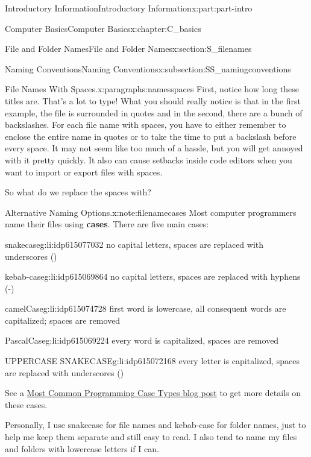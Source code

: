 \documentclass[oneside,10pt,]{book}
\newcommand{\terminology}[1]{\textbf{#1}}
\begin{document}
\begin{partptx}{Introductory Information}{}{Introductory Information}{}{}{x:part:part-intro}
\begin{chapterptx}{Computer Basics}{}{Computer Basics}{}{}{x:chapter:C_basics}
\begin{sectionptx}{File and Folder Names}{}{File and Folder Names}{}{}{x:section:S_filenames}
\begin{subsectionptx}{Naming Conventions}{}{Naming Conventions}{}{}{x:subsection:SS_namingconventions}
\begin{paragraphs}{File Names With Spaces.}{x:paragraphs:namesspaces}
 First, notice how long these titles are. That's a lot to type! What you should really notice is that in the first example, the file is surrounded in quotes and in the second, there are a bunch of backslashes. For each file name with spaces, you have to either remember to enclose the entire name in quotes or to take the time to put a backslash before every space. It may not seem like too much of a hassle, but you will get annoyed with it pretty quickly. It also can cause setbacks inside code editors when you want to import or export files with spaces.%
\par
So what do we replace the spaces with? \begin{note}{Alternative Naming Options.}{x:note:filenamecases}%
Most computer programmers name their files using \terminology{cases}. There are five main cases:%
\begin{descriptionlist}
\begin{dlimedium}{snake\textunderscore{}case}{g:li:idp615077032}%
no capital letters, spaces are replaced with underscores (\textunderscore{})%
\end{dlimedium}%
\begin{dlimedium}{kebab-case}{g:li:idp615069864}%
no capital letters, spaces are replaced with hyphens (-)%
\end{dlimedium}%
\begin{dlimedium}{camelCase}{g:li:idp615074728}%
first word is lowercase, all consequent words are capitalized; spaces are removed%
\end{dlimedium}%
\begin{dlimedium}{PascalCase}{g:li:idp615069224}%
every word is capitalized, spaces are removed%
\end{dlimedium}%
\begin{dlimedium}{UPPER\textunderscore{}CASE\textunderscore{} SNAKE\textunderscore{}CASE}{g:li:idp615072168}%
every letter is capitalized, spaces are replaced with underscores (\textunderscore{})%
\end{dlimedium}%
\end{descriptionlist}
See a \href{https://chaseadams.io/posts/most-common-programming-case-types/}{Most Common Programming Case Types blog post}\footnotemark{} to get more details on these cases.%
\end{note}
%
 Personally, I use snake\textunderscore{}case for file names and kebab-case for folder names, just to help me keep them separate and still easy to read. I also tend to name my files and folders with lowercase letters if I can.%

\end{paragraphs}
\end{subsectionptx}
\end{sectionptx}
\end{chapterptx}
\end{partptx}
\end{document}
